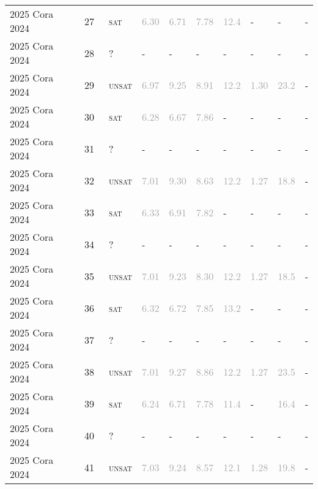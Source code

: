 \begin{center}
{\begin{longtable}{@{}llllllllll@{}}
2025 Cora 2024 & 27 & ~\textsc{sat} & \textcolor{darkgray}{6.30} & \textcolor{darkgray}{6.71} & \textcolor{darkgray}{7.78} & \textcolor{darkgray}{12.4} & - & - & - \\
2025 Cora 2024 & 28 & ~? & - & - & - & - & - & - & - \\
2025 Cora 2024 & 29 & ~\textsc{unsat} & \textcolor{darkgray}{6.97} & \textcolor{darkgray}{9.25} & \textcolor{darkgray}{8.91} & \textcolor{darkgray}{12.2} & \textcolor{darkgray}{1.30} & \textcolor{darkgray}{23.2} & - \\
2025 Cora 2024 & 30 & ~\textsc{sat} & \textcolor{darkgray}{6.28} & \textcolor{darkgray}{6.67} & \textcolor{darkgray}{7.86} & - & - & - & - \\
2025 Cora 2024 & 31 & ~? & - & - & - & - & - & - & - \\
2025 Cora 2024 & 32 & ~\textsc{unsat} & \textcolor{darkgray}{7.01} & \textcolor{darkgray}{9.30} & \textcolor{darkgray}{8.63} & \textcolor{darkgray}{12.2} & \textcolor{darkgray}{1.27} & \textcolor{darkgray}{18.8} & - \\
2025 Cora 2024 & 33 & ~\textsc{sat} & \textcolor{darkgray}{6.33} & \textcolor{darkgray}{6.91} & \textcolor{darkgray}{7.82} & - & - & - & - \\
2025 Cora 2024 & 34 & ~? & - & - & - & - & - & - & - \\
2025 Cora 2024 & 35 & ~\textsc{unsat} & \textcolor{darkgray}{7.01} & \textcolor{darkgray}{9.23} & \textcolor{darkgray}{8.30} & \textcolor{darkgray}{12.2} & \textcolor{darkgray}{1.27} & \textcolor{darkgray}{18.5} & - \\
2025 Cora 2024 & 36 & ~\textsc{sat} & \textcolor{darkgray}{6.32} & \textcolor{darkgray}{6.72} & \textcolor{darkgray}{7.85} & \textcolor{darkgray}{13.2} & - & - & - \\
2025 Cora 2024 & 37 & ~? & - & - & - & - & - & - & - \\
2025 Cora 2024 & 38 & ~\textsc{unsat} & \textcolor{darkgray}{7.01} & \textcolor{darkgray}{9.27} & \textcolor{darkgray}{8.86} & \textcolor{darkgray}{12.2} & \textcolor{darkgray}{1.27} & \textcolor{darkgray}{23.5} & - \\
2025 Cora 2024 & 39 & ~\textsc{sat} & \textcolor{darkgray}{6.24} & \textcolor{darkgray}{6.71} & \textcolor{darkgray}{7.78} & \textcolor{darkgray}{11.4} & - & \textcolor{darkgray}{16.4} & - \\
2025 Cora 2024 & 40 & ~? & - & - & - & - & - & - & - \\
2025 Cora 2024 & 41 & ~\textsc{unsat} & \textcolor{darkgray}{7.03} & \textcolor{darkgray}{9.24} & \textcolor{darkgray}{8.57} & \textcolor{darkgray}{12.1} & \textcolor{darkgray}{1.28} & \textcolor{darkgray}{19.8} & - \\

\end{longtable}}
\end{center}
